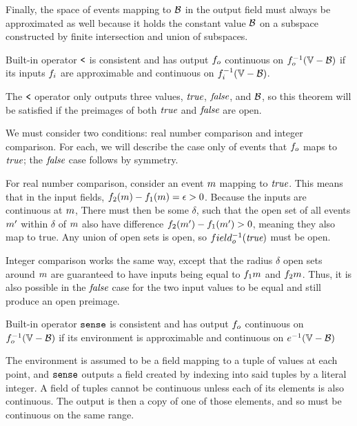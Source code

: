 \documentclass[12pt,a4paper,twoside,openright]{book}
\begin{document}
\begin{appendices}
  Finally, the space of events mapping to $\mathcal{B}$ in the output field must always be approximated as well because it holds the constant value $\mathcal{B}$ on a subspace constructed by finite intersection and union of subspaces.

\begin{lem}\label{thm:comparator}
  Built-in operator $\texttt{<}$ is consistent and has output $f_o$ continuous on $\validdomain{\field_o}$ if its inputs $f_i$ are approximable and continuous on $\validdomain{\field_i}$.
\end{lem}
  The $\texttt{<}$ operator only outputs three values, $\textit{true}$, $\textit{false}$, and $\mathcal{B}$, so this theorem will be satisfied if the preimages of both $\textit{true}$ and $\textit{false}$ are open.
  
  We must consider two conditions: real number comparison and integer comparison.  For each, we will describe the case only of events that $f_o$ maps to $\textit{true}$; the $\textit{false}$ case follows by symmetry.
  
  For real number comparison, consider an event $m$ mapping to $\textit{true}$.  This means that in the input fields, $f_2(m) - f_1(m) = \epsilon > 0$.
  Because the inputs are continuous at $m$, There must then be some $\delta$, such that the open set of all events $m'$ within $\delta$ of $m$ also have difference $f_2(m') - f_1(m') > 0$, meaning they also map to true.
  Any union of open sets is open, so $field_o^{-1}(\textit{true})$ must be open.
  
  Integer comparison works the same way, except that the radius $\delta$ open sets around $m$ are guaranteed to have inputs being equal to $f_1{m}$ and $f_2{m}$.  Thus, it is also possible in the $\textit{false}$ case for the two input values to be equal and still produce an open preimage.

\begin{lem}\label{thm:sense}
  Built-in operator $\texttt{sense}$ is consistent and has output $f_o$ continuous on $\validdomain{\field_o}$ if its environment is approximable and continuous on $\validdomain{\environment}$
\end{lem}
  The environment is assumed to be a field mapping to a tuple of values at each point, and $\texttt{sense}$ outputs a field created by indexing into said tuples by a literal integer.
  A field of tuples cannot be continuous unless each of its elements is also continuous.  The output is then a copy of one of those elements, and so must be continuous on the same range.


\end{appendices}
\end{document}
